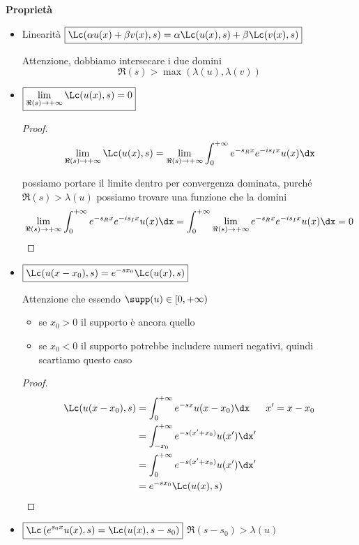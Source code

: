 \textbf{Proprietà}
\begin{itemize}
\item Linearità $\boxed{\Lc(\alpha u(x) + \beta v(x), s) = \alpha \Lc(u(x), s) + \beta \Lc(v(x), s)}$

Attenzione, dobbiamo intersecare i due domini
\begin{equation*}
\boxed{\Re (s) > \max(\lambda (u), \lambda (v))}
\end{equation*}
\item $\boxed{\lim\limits_{\Re (s)\rightarrow + \infty}\Lc(u(x), s) = 0}$

\begin{proof}
\begin{equation*}
\lim\limits_{\Re (s)\rightarrow + \infty}\Lc(u(x), s) = \lim\limits_{\Re (s)\rightarrow + \infty}\int^{+ \infty}_{0} e^{- s_{R} x} e^{- is_{I} x} u(x) \dx
\end{equation*}

possiamo portare il limite dentro per convergenza dominata, purché $\Re (s) > \lambda (u)$ possiamo trovare una funzione che la domini
\begin{equation*}
\lim\limits_{\Re (s)\rightarrow + \infty}\int^{+ \infty}_{0} e^{- s_{R} x} e^{- is_{I} x} u(x) \dx = \int^{+ \infty}_{0}\lim\limits_{\Re (s)\rightarrow + \infty} e^{- s_{R} x} e^{- is_{I} x} u(x) \dx = 0
\end{equation*}
\end{proof}
\item $\boxed{\Lc(u(x - x_{0}), s) = e^{- sx_{0}}\Lc(u(x), s)}$

Attenzione che essendo $\supp(u) \in [0, + \infty)$
\begin{itemize}
\item se $\boxed{x_{0} > 0}$ il supporto è ancora quello
\item se $x_{0} < 0$ il supporto potrebbe includere numeri negativi, quindi scartiamo questo caso
\end{itemize}

\begin{proof}
\begin{align*}
\Lc(u(x - x_{0}), s) & = \int^{+ \infty}_{0} e^{- sx} u(x - x_{0}) \dx & x' = x - x_{0}\\
 & = \int^{+ \infty}_{- x_{0}} e^{- s(x' + x_{0})} u(x') \dx' & \\
 & = \int^{+ \infty}_{0} e^{- s(x' + x_{0})} u(x') \dx' & \\
 & = e^{- sx_{0}}\Lc(u(x), s) &
\end{align*}
\end{proof}
\item $\boxed{\Lc\left(e^{s_{0} x} u(x), s\right) = \Lc(u(x), s - s_{0})}$ $\boxed{\Re (s - s_{0}) > \lambda (u)}$


\end{itemize}
